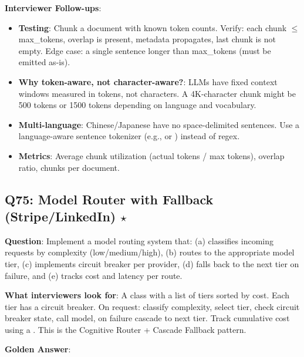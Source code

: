 \textbf{Interviewer Follow-ups}:
\begin{itemize}[leftmargin=*]
    \item \textbf{Testing}: Chunk a document with known token counts. Verify: each chunk $\leq$ max\_tokens, overlap is present, metadata propagates, last chunk is not empty. Edge case: a single sentence longer than max\_tokens (must be emitted as-is).
    \item \textbf{Why token-aware, not character-aware?}: LLMs have fixed context windows measured in tokens, not characters. A 4K-character chunk might be 500 tokens or 1500 tokens depending on language and vocabulary.
    \item \textbf{Multi-language}: Chinese/Japanese have no space-delimited sentences. Use a language-aware sentence tokenizer (e.g.,  or ) instead of regex.
    \item \textbf{Metrics}: Average chunk utilization (actual tokens / max tokens), overlap ratio, chunks per document.
\end{itemize}

\subsection{Q75: Model Router with Fallback (Stripe/LinkedIn) $\star$}

\textbf{Question}: Implement a model routing system that: (a) classifies incoming requests by complexity (low/medium/high), (b) routes to the appropriate model tier, (c) implements circuit breaker per provider, (d) falls back to the next tier on failure, and (e) tracks cost and latency per route.

\textbf{What interviewers look for}: A  class with a list of tiers sorted by cost. Each tier has a circuit breaker. On request: classify complexity, select tier, check circuit breaker state, call model, on failure cascade to next tier. Track cumulative cost using a . This is the Cognitive Router + Cascade Fallback pattern.

\textbf{Golden Answer}:


